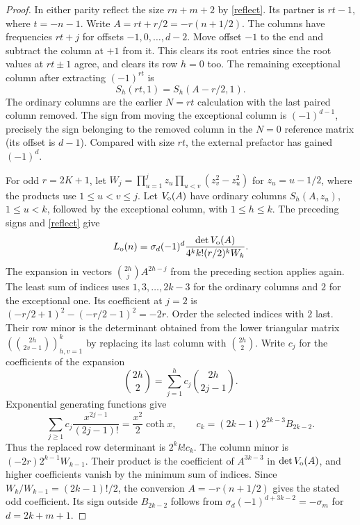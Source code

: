 \documentclass[11pt]{article}
\begin{document}
\begin{proof}
In either parity reflect the size $rn+m+2$ by \eqref{reflect}. Its partner is $rt-1$, where $t=-n-1$. Write $A=rt+r/2=-r(n+1/2)$. The columns have frequencies $rt+j$ for offsets $-1,0,\ldots,d-2$. Move offset $-1$ to the end and subtract the column at $+1$ from it. This clears its root entries since the root values at $rt\pm1$ agree, and clears its row $h=0$ too. The remaining exceptional column after extracting $(-1)^{rt}$ is
\[
 S_h(rt,1)=S_h(A-r/2,1).
\]
The ordinary columns are the earlier $N=rt$ calculation with the last paired column removed. The sign from moving the exceptional column is $(-1)^{d-1}$, precisely the sign belonging to the removed column in the $N=0$ reference matrix (its offset is $d-1$). Compared with size $rt$, the external prefactor has gained $(-1)^d$.

For odd $r=2K+1$, let $W_j=\prod_{u=1}^j z_u\prod_{u<v}(z_v^2-z_u^2)$ for $z_u=u-1/2$, where the products use $1\le u<v\le j$. Let $V_{\rm o}(A)$ have ordinary columns $S_h(A,z_u)$, $1\le u<k$, followed by the exceptional column, with $1\le h\le k$. The preceding signs and \eqref{reflect} give
\[
 L_{\rm o}(n)=\sigma_d(-1)^d
 \frac{\det V_{\rm o}(A)}{4^k k!(r/2)^kW_k}.
\]
The expansion in vectors $\binom{2h}{j}A^{2h-j}$ from the preceding section applies again. The least sum of indices uses $1,3,\ldots,2k-3$ for the ordinary columns and $2$ for the exceptional one. Its coefficient at $j=2$ is
$(-r/2+1)^2-(-r/2-1)^2=-2r$.
Order the selected indices with $2$ last. Their row minor is the determinant obtained from the lower triangular matrix $(\binom{2h}{2v-1})_{h,v=1}^k$ by replacing its last column with $\binom{2h}{2}$. Write $c_j$ for the coefficients of the expansion
\[
 \binom{2h}{2}=\sum_{j=1}^h c_j\binom{2h}{2j-1}.
\]
Exponential generating functions give
\[
 \sum_{j\ge1}c_j\frac{x^{2j-1}}{(2j-1)!}
 =\frac{x^2}2\coth x,\qquad
 c_k=(2k-1)2^{2k-3}B_{2k-2}.
\]
Thus the replaced row determinant is $2^k k!c_k$. The column minor is $(-2r)2^{k-1}W_{k-1}$. Their product is the coefficient of $A^{3k-3}$ in $\det V_{\rm o}(A)$, and higher coefficients vanish by the minimum sum of indices. Since $W_k/W_{k-1}=(2k-1)!/2$, the conversion $A=-r(n+1/2)$ gives the stated odd coefficient. Its sign outside $B_{2k-2}$ follows from $\sigma_d(-1)^{d+3k-2}=-\sigma_m$ for $d=2k+m+1$.


\end{proof}
\end{document}
